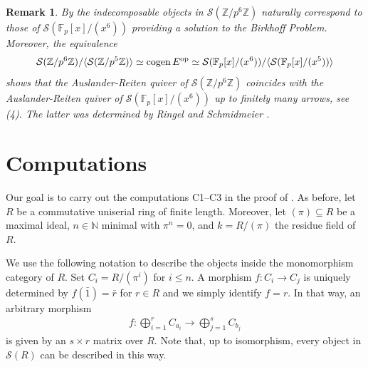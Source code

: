 \documentclass[a4paper]{amsart}
\newcommand{\op}{\textnormal{op}}
\newcommand{\cogen}{\textnormal{cogen}\,}
\numberwithin{equation}{section} \theoremstyle{plain}
\numberwithin{thm}{section}
\newtheorem{rem}[thm]{Remark}
\begin{document}
\begin{rem}\rm By  the indecomposable objects in $\mathcal{S}(\mathbb{Z}/p^6 \mathbb{Z})$ naturally correspond to those of $\mathcal{S}(\mathbb{F}_p[x]/(x^6))$ providing a solution to the Birkhoff Problem. Moreover, the equivalence 
\begin{align*}
    \mathcal{S}(\mathbb{Z}/p^6 \mathbb{Z})/ \langle \mathcal{S}(\mathbb{Z}/p^5 \mathbb{Z}) \rangle \simeq \cogen E^\op \simeq \mathcal{S}(\mathbb{F}_p[x]/(x^6))/ \langle \mathcal{S}(\mathbb{F}_p[x]/(x^{5})) \rangle
\end{align*}
shows that the Auslander-Reiten quiver of $\mathcal{S}(\mathbb{Z}/p^6 \mathbb{Z})$ coincides with the Auslander-Reiten quiver of $\mathcal{S}(\mathbb{F}_p[x]/(x^6))$ up to finitely many arrows, see  (4). The latter was determined by Ringel and Schmidmeier \cite{RS2}.
\end{rem}

\section{Computations}

Our goal is to carry out the computations C1--C3 in the proof of . As before, let $R$ be a commutative uniserial ring of finite length. Moreover, let $(\pi) \subseteq R$ be a maximal ideal, $n\in \mathbb{N}$ minimal with $\pi^n = 0$, and $k = R/(\pi)$ the residue field of $R$.  

We use the following notation to describe the objects inside the monomorphism category of $R$. Set $C_i = R/(\pi^{i})$ for $i \leq n$. A morphism $f\colon C_i\to C_j$ is uniquely determined by $f(\bar{1}) = \bar{r}$ for $r\in R$ and we simply identify $f = r$. In that way, an arbitrary morphism 
\begin{align*}
f\colon \bigoplus_{i=1}^r  C_{a_i} \longrightarrow \bigoplus_{j=1}^s C_{b_j}    
\end{align*}
is given by an $s \times r$ matrix over $R$. Note that, up to isomorphism, every object in $\mathcal{S}(R)$ can be described in this way. 
\end{document}
